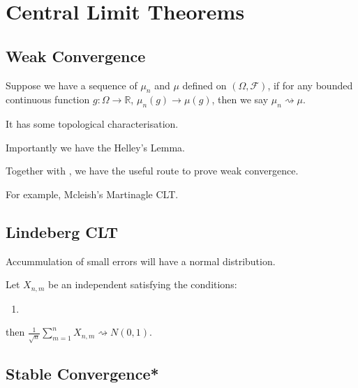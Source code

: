 \section{Central Limit Theorems}

\subsection{Weak Convergence}
Suppose we have a sequence of \(\mu_{n}\) and \(\mu\) defined on \((\Omega, \mathcal{F})\), if for any bounded continuous function \(g: \Omega \to \mathbb{R}\), \(\mu_{n}(g) \to \mu(g)\), then we say \(\mu_{n} \rightsquigarrow \mu\). 

It has some topological characterisation. 

Importantly we have the Helley's Lemma. 

Together with , we have the useful route to prove weak convergence. 

For example, Mcleish's Martinagle CLT. 

\subsection{Lindeberg CLT} 

Accummulation of small errors will have a normal distribution. 

\begin{thm}
    Let \(X_{n,m}\) be an independent  satisfying the conditions:
    \begin{enumerate}
        \item 
    \end{enumerate} 
    then \(\frac{1}{\sqrt{n}} \sum_{m = 1 }^{n}X_{n,m} \rightsquigarrow N(0,1)\). 
\end{thm}

\subsection{Stable Convergence*}

